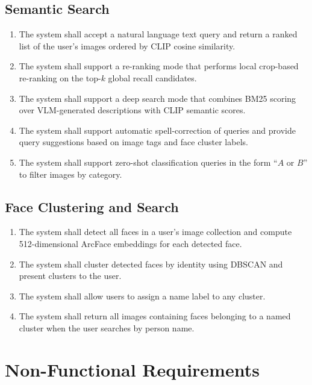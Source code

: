 \documentclass[12pt,a4paper,oneside]{report}
\begin{document}
\subsection{Semantic Search}
\begin{enumerate}[leftmargin=*]
  \item The system shall accept a natural language text query and return
        a ranked list of the user's images ordered by CLIP cosine similarity.
  \item The system shall support a re-ranking mode that performs local
        crop-based re-ranking on the top-$k$ global recall candidates.
  \item The system shall support a deep search mode that combines BM25
        scoring over VLM-generated descriptions with CLIP semantic scores.
  \item The system shall support automatic spell-correction of queries and
        provide query suggestions based on image tags and face cluster labels.
  \item The system shall support zero-shot classification queries
        in the form ``$A$ or $B$'' to filter images by category.
\end{enumerate}

\subsection{Face Clustering and Search}
\begin{enumerate}[leftmargin=*]
  \item The system shall detect all faces in a user's image collection and
        compute 512-dimensional ArcFace embeddings for each detected face.
  \item The system shall cluster detected faces by identity using DBSCAN
        and present clusters to the user.
  \item The system shall allow users to assign a name label to any cluster.
  \item The system shall return all images containing faces belonging to
        a named cluster when the user searches by person name.
\end{enumerate}



\section{Non-Functional Requirements}
\end{document}
